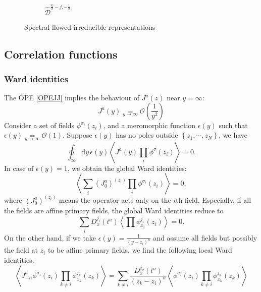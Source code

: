 \documentclass[10pt,a4paper]{article}
\numberwithin{equation}{section}
\newcommand{\vev}[1]{\left\langle #1 \right\rangle}
\begin{document}
\begin{figure}[htbp]
\begin{subfigure}[b]{0.48\textwidth}
        \caption{$\widehat{\mathcal{D}}^{\frac{k}{2}-j, -\frac{1}{2}}$}
        \label{fig:D 1/2-1}
    \end{subfigure}

    \caption{Spectral flowed irreducible representations}
    \label{fig:irrepSF}
\end{figure}

\subsection{Correlation functions}

\subsubsection*{Ward identities}
The OPE \eqref{OPEJJ} implies the behaviour of $J^{a}(z)$ near $y = \infty$:
\begin{equation}
    \boxed{
        J^{a}(y) \underset{y \rightarrow \infty}{=} \mathcal{O}\left(\frac{1}{y^{2}}\right)
    }
\end{equation}
Consider a set of fields $\phi^{\sigma_{i}}(z_{i})$, and a meromorphic function $\epsilon(y)$ such that
$\epsilon(y) \underset{y \rightarrow \infty}{=} \mathcal{O}\left(1\right) $. Suppose $\epsilon(y)$
has no poles outside $\left\{z_{1},\cdots,z_{N} \right\}$, we have 
\begin{equation}
    \oint_{\infty} \mathrm{d} y \, \epsilon(y) \vev{J^{a}(y) \prod_{i} \phi^{\sigma}(z_{i})} = 0. \label{WardId}
\end{equation}
In case of $\epsilon(y) = 1$, we obtain the global Ward identities:
\begin{equation}
    \vev{\sum_{i} \left(J^{a}_{0}\right)^{(z_{i})} \prod_{i} \phi^{\sigma_{i}}(z_{i})} = 0,
\end{equation}
where $\left(J^{a}_{0}\right)^{(z_{i})}$ means the operator acts only on the $i$th field. Especially, if all the fields are affine primary 
fields, the global Ward identities reduce to 
\begin{equation}
    \sum_{i} D^{j_{i}}_{x}(t^{a}) \vev{\prod \phi^{j_{i}}_{x_{i}}(z_{i})} = 0. \label{GlobalWard}
\end{equation}
On the other hand, if we take $\epsilon(y) = \frac{1}{(y-z_{i})^{n}}$ and assume all fields but possibly the field at 
$z_{i}$ to be affine primary fields, we find the following local Ward identities:
\begin{equation}
    \vev{J^{a}_{-n} \phi^{\sigma_{i}}(z_{i}) \prod_{k \neq i} \phi^{j_{k}}_{x_{k}}(z_{k})} = \sum_{k\neq i} \frac{D^{j_{k}}_{x}(t^{a})}{(z_{k}-z_{i})^{n}} \vev{ \phi^{\sigma_{i}}(z_{i}) \prod_{k \neq i} \phi^{j_{k}}_{x_{k}}(z_{k})} \label{LocalWard}
\end{equation}
\end{document}
